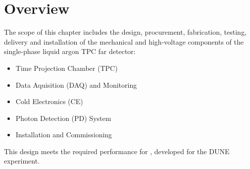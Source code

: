 \section{Overview}
\label{sec:detectors-fd-ref-ov}

The scope of this chapter includes the design, procurement, fabrication, testing, delivery and installation of the mechanical and high-voltage components of the single-phase liquid argon TPC far detector: 

\begin{itemize}
\item Time Projection Chamber (TPC)
\item Data Aquisition (DAQ) and Monitoring
\item Cold Electronics (CE)
\item Photon Detection (PD) System
\item Installation and Commissioning
\end{itemize}

This design meets the required performance for , developed for the DUNE experiment.

